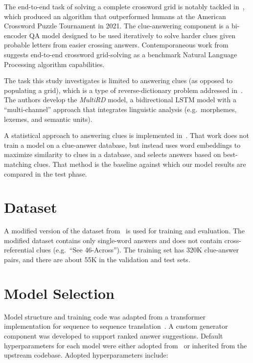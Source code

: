 \documentclass[letterpaper]{article} %
\begin{document}
\begin{NoHyper}
The end-to-end task of solving a complete crossword grid is notably tackled in~\citealp{wallace2022automated},
which produced an algorithm that outperformed humans at the American Crossword Puzzle Tournament in 2021.
The clue-answering component is a bi-encoder QA model designed to be used iteratively to solve harder clues
given probable letters from easier crossing answers.
Contemporaneous work from~\citealp{kulshreshtha2022across} suggests end-to-end crossword grid-solving
as a benchmark Natural Language Processing algorithm capabilities.

The task this study investigates is limited to answering clues (as opposed to populating a grid),
which is a type of reverse-dictionary problem addressed in~\citealp{zhang2019multichannel}.
The authors develop the \textit{MultiRD} model, a bidirectional LSTM model with a ``multi-channel'' approach that
integrates linguistic analysis (e.g.~morphemes, lexemes, and semantic units).

A statistical approach to answering clues is implemented in~\citealp{baselinesolver}.
That work does not train a model on a clue-answer database, but instead uses word embeddings to maximize similarity to
clues in a database, and selects answers based on best-matching clues.
That method is the baseline against which our model results are compared in the test phase.

\section{Dataset}
\label{sec:dataset}

A modified version of the dataset from~\citealp{kulshreshtha2022across} is used for training and evaluation.
The modified dataset contains only single-word answers and does not contain cross-referential clues (e.g.~``See 46-Across'').
The training set has 320K clue-answer pairs, and there are about 55K in the validation and test sets.

\section{Model Selection}
\label{sec:model}

Model structure and training code was adapted from a transformer implementation for sequence to sequence translation~\cite{chegde2022}.
A custom generator component was developed to support ranked answer suggestions.
Default hyperparameters for each model were either adopted from~\citealp{vaswani2017} or inherited from the upstream codebase.
Adopted hyperparameters include:


\end{NoHyper}
\end{document}
